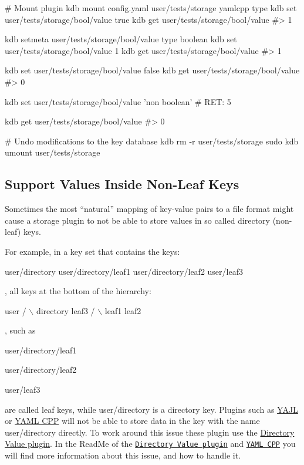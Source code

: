 \begin{DoxyCode}
# Mount plugin
kdb mount config.yaml user/tests/storage yamlcpp type
kdb set user/tests/storage/bool/value true
kdb get user/tests/storage/bool/value
#> 1

kdb setmeta user/tests/storage/bool/value type boolean
kdb set user/tests/storage/bool/value 1
kdb get user/tests/storage/bool/value
#> 1

kdb set user/tests/storage/bool/value false
kdb get user/tests/storage/bool/value
#> 0

kdb set user/tests/storage/bool/value 'non boolean'
# RET: 5

kdb get user/tests/storage/bool/value
#> 0

# Undo modifications to the key database
kdb rm -r user/tests/storage
sudo kdb umount user/tests/storage
\end{DoxyCode}


\subsection*{Support Values Inside Non-\/\+Leaf Keys}

Sometimes the most “natural” mapping of key-\/value pairs to a file format might cause a storage plugin to not be able to store values in so called directory (non-\/leaf) keys.

For example, in a key set that contains the keys\+:


\begin{DoxyCode}
user/directory
user/directory/leaf1
user/directory/leaf2
user/leaf3
\end{DoxyCode}


, all keys at the bottom of the hierarchy\+:


\begin{DoxyCode}
        user
      /      \(\backslash\)
  directory  leaf3
   /     \(\backslash\)
leaf1   leaf2
\end{DoxyCode}


, such as


\begin{DoxyItemize}
\item {\ttfamily user/directory/leaf1}
\item {\ttfamily user/directory/leaf2}
\item {\ttfamily user/leaf3}
\end{DoxyItemize}

are called leaf keys, while {\ttfamily user/directory} is a directory key. Plugins such as \hyperlink{md_src_plugins_yajl_README_src_plugins_yajl_README_md}{Y\+A\+JL} or \hyperlink{md_src_plugins_yamlcpp_README_src_plugins_yamlcpp_README_md}{Y\+A\+ML C\+PP} will not be able to store data in the key with the name {\ttfamily user/directory} directly. To work around this issue these plugin use the \hyperlink{md_src_plugins_directoryvalue_README_src_plugins_directoryvalue_README_md}{Directory Value plugin}. In the Read\+Me of the \href{https://www.libelektra.org/plugins/directoryvalue}{\tt Directory Value plugin} and \href{https://www.libelektra.org/plugins/yamlcpp}{\tt Y\+A\+ML C\+PP} you will find more information about this issue, and how to handle it.

